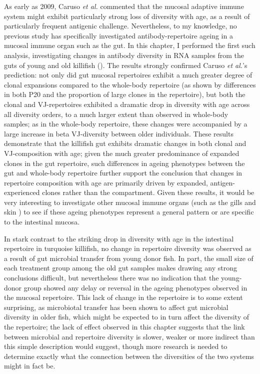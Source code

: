 As early as 2009, Caruso \textit{et al.} \parencite{caruso2009immunosenescence} commented that the mucosal adaptive immune system might exhibit particularly strong loss of diversity with age, as a result of particularly frequent antigenic challenge. Nevertheless, to my knowledge, no previous study has specifically investigated antibody-repertoire ageing in a mucosal immune organ such as the gut. In this chapter, I performed the first such analysis, investigating changes in antibody diversity in RNA samples from the guts of young and old killifish (). The results strongly confirmed Caruso \textit{et al.}'s prediction: not only did gut mucosal repertoires exhibit a much greater degree of clonal expansions compared to the whole-body repertoire (as shown by differences in both P20 and the proportion of large clones in the repertoire), but both the clonal and VJ-repertoires exhibited a dramatic drop in diversity with age across all diversity orders, to a much larger extent than observed in whole-body samples; as in the whole-body repertoire, these changes were accompanied by a large increase in beta VJ-diversity between older individuals. These results demonstrate that the killifish gut exhibits dramatic changes in both clonal and VJ-composition with age; given the much greater predominance of expanded clones in the gut repertoire, such differences in ageing phenotypes between the gut and whole-body repertoire further support the conclusion that changes in repertoire composition with age are primarily driven by expanded, antigen-experienced clones rather than the \naive compartment. Given these results, it would be very interesting to investigate other mucosal immune organs (such as the gills and skin \parencite{xu2013igtskin}) to see if these ageing phenotypes represent a general pattern or are specific to the intestinal mucosa.

In stark contrast to the striking drop in diversity with age in the intestinal repertoire in turquoise killifish, no change in repertoire diversity was observed as a result of gut microbial transfer from young donor fish. In part, the small size of each treatment group among the old gut samples makes drawing any strong conclusions difficult, but nevertheless there was no indication that the young-donor group showed any delay or reversal in the ageing phenotypes observed in the mucosal repertoire. This lack of change in the repertoire is to some extent surprising, as microbiotal transfer has been shown to affect gut microbial diversity in older fish, which might be expected to in turn affect the diversity of the repertoire; the lack of effect observed in this chapter suggests that the link between microbial and repertoire diversity is slower, weaker or more indirect than this simple description would suggest, though more research is needed to determine exactly what the connection between the diversities of the two systems might in fact be. 

